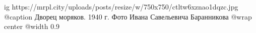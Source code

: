  
 
 
 
 

\ifcmt
  ig https://mrpl.city/uploads/posts/resize/w/750x750/ctltw6xznao1dqzc.jpg
	@caption Дворец моряков. 1940 г. Фото Ивана Савельевича Баранникова
  @wrap center
  @width 0.9
\fi
